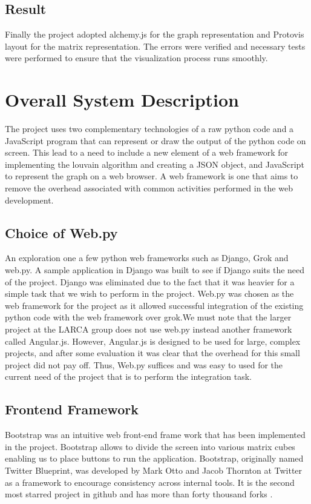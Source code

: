 \section{Result}
Finally the project adopted alchemy.js for the graph representation and Protovis layout for the matrix representation.  The errors were verified and necessary tests were performed to ensure that the visualization process runs smoothly. 

\chapter{Overall System Description}
The project uses two complementary technologies of a raw python code and a JavaScript program that can represent or draw the output of the python code on screen. This lead to a need to include a new element of a web framework for implementing the louvain algorithm and creating a JSON object, and JavaScript to represent the graph on a web browser.   A web framework is one that aims to remove the overhead associated with common activities performed in the web development. 
\section{Choice of Web.py}
An exploration one a few python web frameworks such as Django, Grok and web.py. A sample application in Django was built to see if Django suits the need of the project. Django was eliminated due to the fact that it was heavier for a simple task that we wish to perform in the project. Web.py was chosen as the web framework for the project as it allowed successful integration  of the existing python code with the web framework over grok.We must note that the larger project at the LARCA group does not use web.py instead another framework called Angular.js. However, Angular.js is designed to be used for large, complex projects, and after some evaluation it was clear that the overhead for this small project did not pay off. 
Thus, Web.py suffices and was easy to used for the current need of the project that is to perform the integration task.  

\section{Frontend Framework}
Bootstrap was an intuitive web front-end frame work that has been implemented in the project.  Bootstrap allows to divide the screen into various matrix cubes enabling us to place buttons to run the application. Bootstrap, originally named Twitter Blueprint, was developed by Mark Otto and Jacob Thornton at Twitter as a framework to encourage consistency across internal tools. It is the second most starred project in github and has more than forty thousand forks \cite{bootstrap}.


